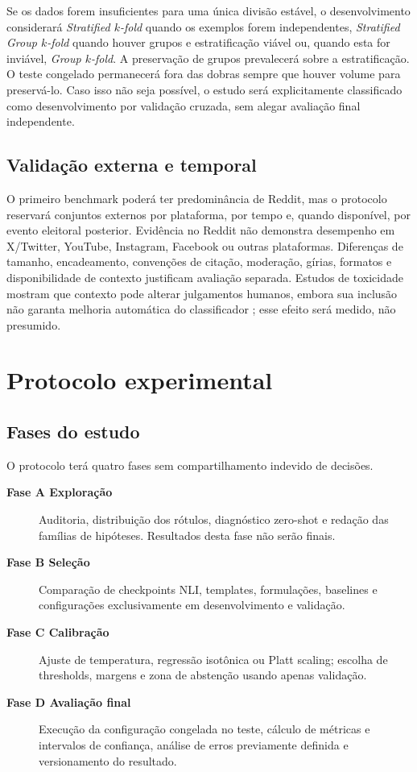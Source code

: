 Se os dados forem insuficientes para uma única divisão estável, o desenvolvimento considerará \emph{Stratified \(k\)-fold} quando os exemplos forem independentes, \emph{Stratified Group \(k\)-fold} quando houver grupos e estratificação viável ou, quando esta for inviável, \emph{Group \(k\)-fold}. A preservação de grupos prevalecerá sobre a estratificação. O teste congelado permanecerá fora das dobras sempre que houver volume para preservá-lo. Caso isso não seja possível, o estudo será explicitamente classificado como desenvolvimento por validação cruzada, sem alegar avaliação final independente.

\subsection{Validação externa e temporal}

O primeiro benchmark poderá ter predominância de Reddit, mas o protocolo reservará conjuntos externos por plataforma, por tempo e, quando disponível, por evento eleitoral posterior. Evidência no Reddit não demonstra desempenho em X/Twitter, YouTube, Instagram, Facebook ou outras plataformas. Diferenças de tamanho, encadeamento, convenções de citação, moderação, gírias, formatos e disponibilidade de contexto justificam avaliação separada. Estudos de toxicidade mostram que contexto pode alterar julgamentos humanos, embora sua inclusão não garanta melhoria automática do classificador \cite{pavlopoulos2020}; esse efeito será medido, não presumido.

\section{Protocolo experimental}
\label{sec:protocolo-experimental}

\subsection{Fases do estudo}

O protocolo terá quatro fases sem compartilhamento indevido de decisões.

\begin{description}
\item[\textbf{Fase A Exploração}] Auditoria, distribuição dos rótulos, diagnóstico zero-shot e redação das famílias de hipóteses. Resultados desta fase não serão finais.
\item[\textbf{Fase B Seleção}] Comparação de checkpoints NLI, templates, formulações, baselines e configurações exclusivamente em desenvolvimento e validação.
\item[\textbf{Fase C Calibração}] Ajuste de temperatura, regressão isotônica ou Platt scaling; escolha de thresholds, margens e zona de abstenção usando apenas validação.
\item[\textbf{Fase D Avaliação final}] Execução da configuração congelada no teste, cálculo de métricas e intervalos de confiança, análise de erros previamente definida e versionamento do resultado.
\end{description}

